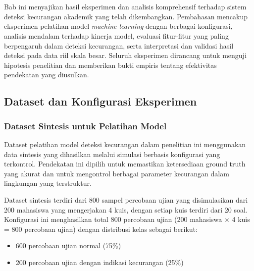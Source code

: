 \chapter{\babEmpat}
\label{bab:4}

Bab ini menyajikan hasil eksperimen dan analisis komprehensif terhadap sistem deteksi kecurangan akademik yang telah dikembangkan. Pembahasan mencakup eksperimen pelatihan model \textit{machine learning} dengan berbagai konfigurasi, analisis mendalam terhadap kinerja model, evaluasi fitur-fitur yang paling berpengaruh dalam deteksi kecurangan, serta interpretasi dan validasi hasil deteksi pada data riil skala besar. Seluruh eksperimen dirancang untuk menguji hipotesis penelitian dan memberikan bukti empiris tentang efektivitas pendekatan yang diusulkan.

\section{Dataset dan Konfigurasi Eksperimen}
\label{sec:datasetKonfigurasi}

\subsection{Dataset Sintesis untuk Pelatihan Model}
\label{subsec:datasetSintesis}

Dataset pelatihan model deteksi kecurangan dalam penelitian ini menggunakan data sintesis yang dihasilkan melalui simulasi berbasis konfigurasi yang terkontrol. Pendekatan ini dipilih untuk memastikan ketersediaan ground truth yang akurat dan untuk mengontrol berbagai parameter kecurangan dalam lingkungan yang terstruktur.

Dataset sintesis terdiri dari 800 sampel percobaan ujian yang disimulasikan dari 200 mahasiswa yang mengerjakan 4 kuis, dengan setiap kuis terdiri dari 20 soal. Konfigurasi ini menghasilkan total 800 percobaan ujian (200 mahasiswa $\times$ 4 kuis = 800 percobaan ujian) dengan distribusi kelas sebagai berikut:
\begin{itemize}
    \item 600 percobaan ujian normal (75\%)
    \item 200 percobaan ujian dengan indikasi kecurangan (25\%)
\end{itemize}

